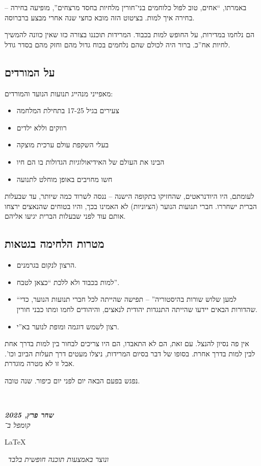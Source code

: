 \documentclass[]{article}
\newcommand\en[1] {\begin{otherlanguage}{english}#1\end{otherlanguage}}
\newcommand\ndoc  {\dotfill \\ \vfil {\begin{center}
			{\textbf{\textit{שחר פרץ, 2025}} \\
				\scriptsize \textit{קומפל ב־}\en{\LaTeX}\,\textit{ ונוצר באמצעות תוכנה חופשית בלבד}}
	\end{center}} \vfil	}
\theoremstyle{definition}
\begin{document}
	באמרתו, ``אחים, טוב לפול כלוחמים בני־חורין מלחיות בחסד מרצחים'', מופיעה בחירה – בחירה איך למות. בציטוט הזה מובא כחצי שנה אחרי מבצע ברברוסה. 
	
	הם נלחמו במדירות, על החופש למות בכבוד. המרידות תוכננו בצורה כזו שאין כוונה להמשיך לחיות אח''כ. ברור היה לכולם שהם נלחמים בכוח גדול מהם וחזק מהם בסדר גודל. 
	
	\subsection{על המורדים}
	מאפייני מנהייג תנועות הנועד והמורדים: 
	\begin{itemize}
		\item צעירים בגיל 17-25 בתחילת המלחמה
		\item רווקים וללא ילדים
		\item בעלי השקפת עולם ערכית מוצקה
		\item הבינו את העולם של האידיאולוגיות הגדולות בו הם חיו
		\item חשו מחויבים באופן מוחלט לתנועה
	\end{itemize}
	
	לעומתם, היו היודנראטים, שהחזיקו בתקופה הישנה – ננסה לשרוד כמה שיותר, עד שבעלות הברית ישחררו. חברי תנועות הנוער (הציוניות) לא האמינו בכך, והיו בטוחים שהנאצים ירצחו אותם עוד לפני שבעלות הברית יגיעו אליהם. 
	\subsection{מטרות הלחימה בגטאות}
	\begin{itemize}
		\item הרצון לנקום בגרמנים. 
		\item למות בכבוד ולא ללכת ``כצאן לטבח''. 
		\item ``למען שלוש שורות בהיסטוריה'' – תפישה שהייתה לכל חברי תנועות הנוער, כדי שהדורות הבאים יידעו שהייתה התנגדות יהודית לנאצים, והיהודים לחמו ומתו כבני חורין. 
		\item רצון לשמש דוגמה ומופת לנוער בא''י. 
	\end{itemize}
	
	אין פה נסיון להנצל. עם זאת, הם לא התאבדו, הם היו צריכים לבחור בין למות בדרך אחת לבין למות בדרך אחרת. בסופו של דבר בסיום המרידות, ניצלו מעטים דרך תעלות הביוב וכו'. אבל זו לא מטרה מוגדרת. 
	
	נפגש בפעם הבאה יום לפני יום כיפור. שנה טובה. 
	
	
	
	
	\ndoc
\end{document}
